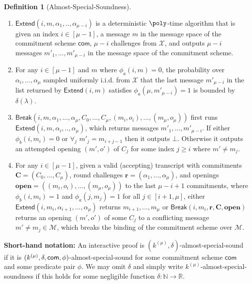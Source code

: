 \documentclass{article}
\theoremstyle{definition}
\newtheorem{definition}{Definition}
\newcommand{\benedikt}[1]{{\textcolor{blue}{[\bf Benedikt: #1]}}}
\begin{document}
\begin{definition}[Almost-Special-Soundness]
\begin{enumerate}
\item  $\textsf{Extend}(i, m, \alpha_1,..,\alpha_{\mu-i})$ is a deterministic $\poly$-time algorithm that is given an index $i \in [\mu-1]$, a message $m$ in the message space of the commitment scheme $\textsf{com}$, $\mu-i$ challenges from $\mathcal{X}$, and outputs $\mu-i$ messages $m'_1,...,m'_{\mu-i}$ in the message space of the commitment scheme. 
\item For any $i \in [\mu-1]$ and $m$ where $\phi_a(i,m) = 0$, the probability over $\alpha_i,...,\alpha_\mu$ sampled uniformly i.i.d. from $\mathcal{X}$ that the last message $m'_{\mu-i}$ in the list returned by $\textsf{Extend}(i, m)$ satisfies $\phi_a(\mu, m'_{\mu-i}) = 1$ is bounded by $\delta(\lambda)$.   

\item $\textsf{Break}(i, m, \alpha_1,...,\alpha_\mu, C_0,...,C_\mu, (m_i, o_i),...,(m_{\mu}, o_{\mu}))$ first runs $\textsf{Extend}(i, m, \alpha_i,..,\alpha_{\mu})$, which returns messages $m'_1,...,m'_{\mu-i}$. If  either $\phi_b(i, m_i) = 0$ or $\forall_j$ $m'_j = m_{i + j -1}$ then it outputs $\bot$. Otherwise it outputs an attempted opening $(m', o')$ of $C_j$ for some index $j \geq i$ where $m' \neq m_j$. %



\item For any $i \in [\mu-1]$, given a valid (accepting) transcript with commitments $\mathbf{C} = (C_0,...,C_\mu)$, round challenges $\mathbf{r} = (\alpha_1,...,\alpha_{\mu})$, and openings $\mathbf{open} = ((m_{i},o_{i}),...,(m_\mu, o_\mu))$ to the last $\mu-i+1$ commitments, where $\phi_b(i, m_i) = 1$ and $\phi_a(j, m_j) = 1$ for all $j \in [i+1,\mu]$, either $\textsf{Extend}(i, m_i, \alpha_{i+1},...,\alpha_\mu)$ returns $m_{i+1},...,m_{\mu}$ or $\textsf{Break}(i, m_i, \mathbf{r}, \mathbf{C}, \mathbf{open})$ returns an opening $(m', o')$ of some $C_j$ to a conflicting message $m' \neq m_j \in \mathcal{M}$, which breaks the binding of the commitment scheme over $\mathcal{M}$.
\end{enumerate} 

\textbf{Short-hand notation:} An interactive proof is $(k^{(\mu)}, \delta)$-almost-special-sound if it is $(k^{(\mu)}, \delta, \mathsf{com}, \phi)$-almost-special-sound for some commitment scheme $\textsf{com}$ and some predicate pair $\phi$. We may omit $\delta$ and simply write $k^{(\mu)}$-almost-special-soundness if this holds for some negligible function $\delta: \mathbb{N} \rightarrow \mathbb{R}$. 
\end{definition} 
\end{document}
